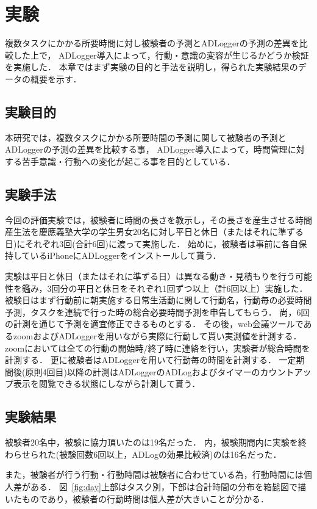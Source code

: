 \documentclass[submit,techrep,noauthor]{ipsj}
\begin{document}
\section{実験}
複数タスクにかかる所要時間に対し被験者の予測とADLoggerの予測の差異を比較した上で，
ADLogger導入によって，行動・意識の変容が生じるかどうか検証を実施した．
本章ではまず実験の目的と手法を説明し，得られた実験結果のデータの概要を示す．

\subsection{実験目的}
本研究では，複数タスクにかかる所要時間の予測に関して被験者の予測とADLoggerの予測の差異を比較する事，
ADLogger導入によって，時間管理に対する苦手意識・行動への変化が起こる事を目的としている．

\subsection{実験手法}
今回の評価実験では，被験者に時間の長さを教示し，その長さを産生させる時間産生法\cite{Oguro1961}\cite{Tayama2018}を慶應義塾大学の学生男女20名に対し平日と休日（またはそれに準ずる日)にそれぞれ3回(合計6回)に渡って実施した．
始めに，被験者は事前に各自保持しているiPhoneにADLoggerをインストールして貰う．

実験は平日と休日（またはそれに準ずる日）は異なる動き・見積もりを行う可能性を鑑み，3回分の平日と休日をそれぞれ1回ずつ以上（計6回以上）実施した．
被験日はまず行動前に朝実施する日常生活動に関して行動名，行動毎の必要時間予測，タスクを連続で行った時の総合必要時間予測を申告してもらう．
尚，6回の計測を通じて予測を適宜修正できるものとする．
その後，web会議ツールであるzoomおよびADLoggerを用いながら実際に行動して貰い実測値を計測する．
zoomにおいては全ての行動の開始時/終了時に連絡を行い，実験者が総合時間を計測する．
更に被験者はADLoggerを用いて行動毎の時間を計測する．
一定期間後(原則4回目)以降の計測はADLoggerのADLogおよびタイマーのカウントアップ表示を閲覧できる状態にしながら計測して貰う．

\subsection{実験結果}
被験者20名中，被験に協力頂いたのは19名だった．
内，被験期間内に実験を終わらせられた(被験回数6回以上，ADLogの効果比較済)のは16名だった．

また，被験者が行う行動・行動時間は被験者に合わせている為，行動時間には個人差がある．
図~\ref{fig:day}上部はタスク別，下部は合計時間の分布を箱髭図で描いたものであり，被験者の行動時間は個人差が大きいことが分かる．
\end{document}
